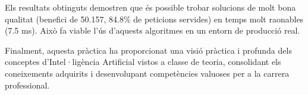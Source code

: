 Els resultats obtinguts demostren que és possible trobar solucions de molt bona qualitat (benefici de 50.157, 84.8\% de peticions servides) en temps molt raonables (7.5 ms). Això fa viable l'ús d'aquests algoritmes en un entorn de producció real.

Finalment, aquesta pràctica ha proporcionat una visió pràctica i profunda dels conceptes d'Intel·ligència Artificial vistos a classe de teoria, consolidant els coneixements adquirits i desenvolupant competències valuoses per a la carrera professional.